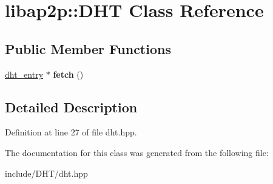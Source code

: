 \hypertarget{classlibap2p_1_1DHT}{\section{libap2p\-:\-:D\-H\-T Class Reference}
\label{classlibap2p_1_1DHT}
}
\subsection*{Public Member Functions}
\begin{DoxyCompactItemize}
\item 
\hypertarget{classlibap2p_1_1DHT_a2be1b5d1723483db68c7f9d31307f354}{\hyperlink{classlibap2p_1_1dht__entry}{dht\-\_\-entry} $\ast$ {\bfseries fetch} ()}\label{classlibap2p_1_1DHT_a2be1b5d1723483db68c7f9d31307f354}

\end{DoxyCompactItemize}


\subsection{Detailed Description}


Definition at line 27 of file dht.\-hpp.



The documentation for this class was generated from the following file\-:\begin{DoxyCompactItemize}
\item 
include/\-D\-H\-T/dht.\-hpp\end{DoxyCompactItemize}
